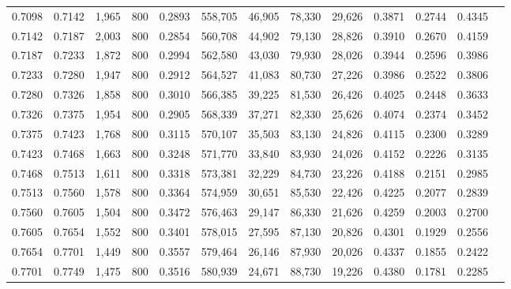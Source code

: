 \begin{tabular}{rrrrrrrrrrrrr}
0.7098 & 0.7142 &  1,965 &   800 &                                     0.2893 & 558,705 &  46,905 &  78,330 &  29,626 & 0.3871 & 0.2744 & 0.4345 \\
0.7142 & 0.7187 &  2,003 &   800 &                                     0.2854 & 560,708 &  44,902 &  79,130 &  28,826 & 0.3910 & 0.2670 & 0.4159 \\
0.7187 & 0.7233 &  1,872 &   800 &                                     0.2994 & 562,580 &  43,030 &  79,930 &  28,026 & 0.3944 & 0.2596 & 0.3986 \\
0.7233 & 0.7280 &  1,947 &   800 &                                     0.2912 & 564,527 &  41,083 &  80,730 &  27,226 & 0.3986 & 0.2522 & 0.3806 \\
0.7280 & 0.7326 &  1,858 &   800 &                                     0.3010 & 566,385 &  39,225 &  81,530 &  26,426 & 0.4025 & 0.2448 & 0.3633 \\
0.7326 & 0.7375 &  1,954 &   800 &                                     0.2905 & 568,339 &  37,271 &  82,330 &  25,626 & 0.4074 & 0.2374 & 0.3452 \\
0.7375 & 0.7423 &  1,768 &   800 &                                     0.3115 & 570,107 &  35,503 &  83,130 &  24,826 & 0.4115 & 0.2300 & 0.3289 \\
0.7423 & 0.7468 &  1,663 &   800 &                                     0.3248 & 571,770 &  33,840 &  83,930 &  24,026 & 0.4152 & 0.2226 & 0.3135 \\
0.7468 & 0.7513 &  1,611 &   800 &                                     0.3318 & 573,381 &  32,229 &  84,730 &  23,226 & 0.4188 & 0.2151 & 0.2985 \\
0.7513 & 0.7560 &  1,578 &   800 &                                     0.3364 & 574,959 &  30,651 &  85,530 &  22,426 & 0.4225 & 0.2077 & 0.2839 \\
0.7560 & 0.7605 &  1,504 &   800 &                                     0.3472 & 576,463 &  29,147 &  86,330 &  21,626 & 0.4259 & 0.2003 & 0.2700 \\
0.7605 & 0.7654 &  1,552 &   800 &                                     0.3401 & 578,015 &  27,595 &  87,130 &  20,826 & 0.4301 & 0.1929 & 0.2556 \\
0.7654 & 0.7701 &  1,449 &   800 &                                     0.3557 & 579,464 &  26,146 &  87,930 &  20,026 & 0.4337 & 0.1855 & 0.2422 \\
0.7701 & 0.7749 &  1,475 &   800 &                                     0.3516 & 580,939 &  24,671 &  88,730 &  19,226 & 0.4380 & 0.1781 & 0.2285 \\

\end{tabular}
